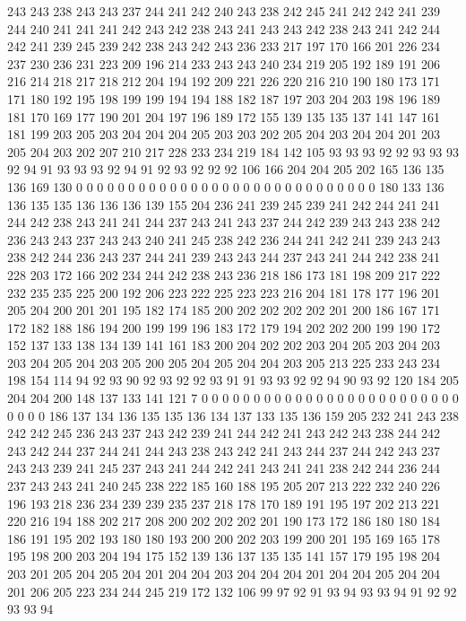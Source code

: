243 243 238 243 243 237 244 241 242 240 243 238 242 245 241 242 242 241 239 244
240 241 241 241 242 243 242 238 243 241 243 243 242 238 243 241 242 244 242 241
239 245 239 242 238 243 242 243 236 233 217 197 170 166 201 226 234 237 230 236
231 223 209 196 214 233 243 243 240 234 219 205 192 189 191 206 216 214 218 217
218 212 204 194 192 209 221 226 220 216 210 190 180 173 171 171 180 192 195 198
199 199 194 194 188 182 187 197 203 204 203 198 196 189 181 170 169 177 190 201
204 197 196 189 172 155 139 135 135 137 141 147 161 181 199 203 205 203 204 204
204 205 203 203 202 205 204 203 204 204 201 203 205 204 203 202 207 210 217 228
233 234 219 184 142 105 93 93 93 92 92 93 93 93 92 94 91 93 93 93
92 94 91 92 93 92 92 92 106 166 204 204 205 202 165 136 135 136 169 130
0 0 0 0 0 0 0 0 0 0 0 0 0 0 0 0 0 0 0 0
0 0 0 0 0 0 0 0 0 180 133 136 136 135 135 136 136 136 139 155
204 236 241 239 245 239 241 242 244 241 241 244 242 238 243 241 241 244 237 243
241 243 237 244 242 239 243 243 238 242 236 243 243 237 243 243 240 241 245 238
242 236 244 241 242 241 239 243 243 238 242 244 236 243 237 244 241 239 243 243
244 237 243 241 244 242 238 241 228 203 172 166 202 234 244 242 238 243 236 218
186 173 181 198 209 217 222 232 235 235 225 200 192 206 223 222 225 223 223 216
204 181 178 177 196 201 205 204 200 201 201 195 182 174 185 200 202 202 202 202
201 200 186 167 171 172 182 188 186 194 200 199 199 196 183 172 179 194 202 202
200 199 190 172 152 137 133 138 134 139 141 161 183 200 204 202 202 203 204 205
203 204 203 203 204 205 204 203 205 200 205 204 205 204 204 203 205 213 225 233
243 234 198 154 114 94 92 93 90 92 93 92 92 93 91 91 93 93 92 92
94 90 93 92 120 184 205 204 204 200 148 137 133 141 121 7 0 0 0 0
0 0 0 0 0 0 0 0 0 0 0 0 0 0 0 0 0 0 0 0
0 0 0 0 0 186 137 134 136 135 135 136 134 137 133 135 136 159 205 232
241 243 238 242 242 245 236 243 237 243 242 239 241 244 242 241 243 242 243 238
244 242 243 242 244 237 244 241 244 243 238 243 242 241 243 244 237 244 242 243
237 243 243 239 241 245 237 243 241 244 242 241 243 241 241 238 242 244 236 244
237 243 243 241 240 245 238 222 185 160 188 195 205 207 213 222 232 240 226 196
193 218 236 234 239 239 235 237 218 178 170 189 191 195 197 202 213 221 220 216
194 188 202 217 208 200 202 202 202 201 190 173 172 186 180 180 184 186 191 195
202 193 180 180 193 200 200 202 203 199 200 201 195 169 165 178 195 198 200 203
204 194 175 152 139 136 137 135 135 141 157 179 195 198 204 203 201 205 204 205
204 201 204 204 203 204 204 204 201 204 204 205 204 204 201 206 205 223 234 244
245 219 172 132 106 99 97 92 91 93 94 93 93 94 91 92 92 93 93 94
